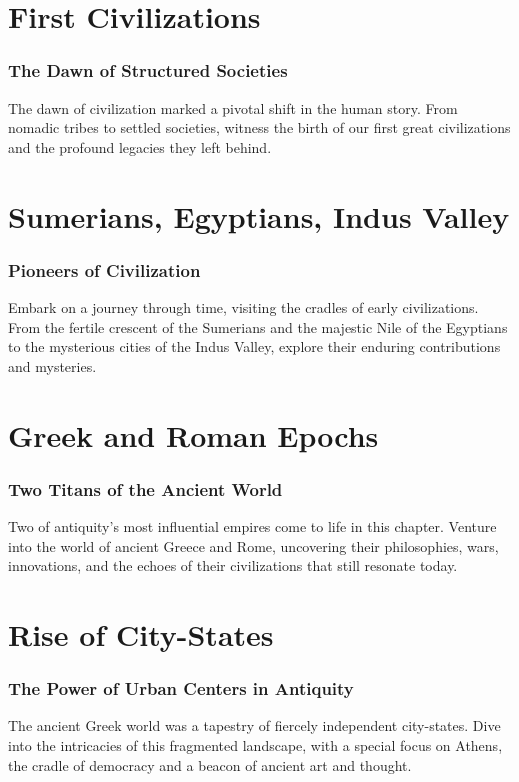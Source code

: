 \documentclass[a4paper,12pt]{book}
\begin{document}
\chapter{First Civilizations}
\subsection*{The Dawn of Structured Societies}
The dawn of civilization marked a pivotal shift in the human story. From nomadic tribes to settled societies, witness the birth of our first great civilizations and the profound legacies they left behind.


\chapter{Sumerians, Egyptians, Indus Valley}
\subsection*{Pioneers of Civilization}
Embark on a journey through time, visiting the cradles of early civilizations. From the fertile crescent of the Sumerians and the majestic Nile of the Egyptians to the mysterious cities of the Indus Valley, explore their enduring contributions and mysteries.

\chapter{Greek and Roman Epochs}
\subsection*{Two Titans of the Ancient World}
Two of antiquity's most influential empires come to life in this chapter. Venture into the world of ancient Greece and Rome, uncovering their philosophies, wars, innovations, and the echoes of their civilizations that still resonate today.

\chapter{Rise of City-States}
\subsection*{The Power of Urban Centers in Antiquity}
The ancient Greek world was a tapestry of fiercely independent city-states. Dive into the intricacies of this fragmented landscape, with a special focus on Athens, the cradle of democracy and a beacon of ancient art and thought.
\end{document}
